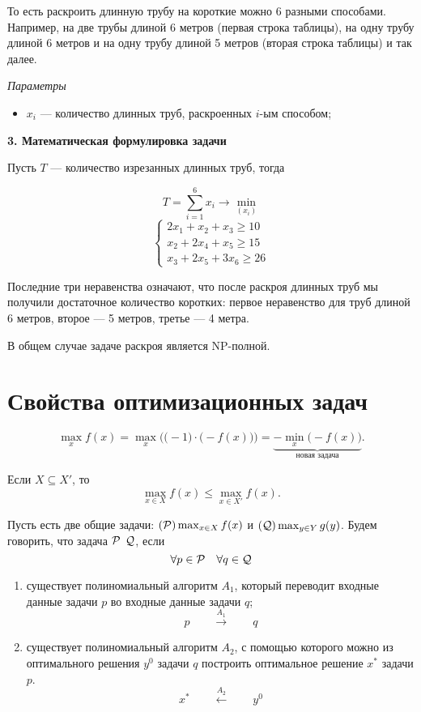 То есть раскроить длинную трубу на короткие можно 6 разными способами. Например, на две трубы длиной 6 метров (первая строка таблицы), на одну трубу длиной 6 метров и на одну трубу длиной 5 метров (вторая строка таблицы) и так далее.

\bigskip

\textit{Параметры}

\begin{itemize}[nosep]
	\item $x_i$ --- количество длинных труб, раскроенных $i$-ым способом;
\end{itemize}

\bigskip

\textbf{3. Математическая формулировка задачи}

Пусть $T$ --- количество изрезанных длинных труб, тогда

\[
T = \sum_{i=1}^6 x_i \to \min_{(x_i)}
\]
\[
\begin{cases}
	2x_1 + x_2 + x_3 \ge 10 \\
	x_2 + 2x_4 + x_5 \ge 15 \\
	x_3 + 2x_5 + 3x_6 \ge 26
\end{cases}
\]

Последние три неравенства означают, что после раскроя длинных труб мы получили достаточное количество коротких: первое неравенство для труб длиной 6 метров, второе --- 5 метров, третье --- 4 метра.

\remark

В общем случае задаче раскроя является NP-полной.

\section{Свойства оптимизационных задач}

\fact

\[\max_x f(x) = \max_x \Big(\big(-1\big) \cdot \big(-f(x)\big)\Big) = \underbrace{-\min_x \big(-f(x)\big)}_{\text{новая задача}}.\]


Если $X \subseteq X'$, то
\[
\max_{x \in X} f(x) \le \max_{x \in X'} f(x).
\]


Пусть есть две общие задачи: $(\P) \max_{x \in X} f(x)$ и $(\Q) \max_{y \in Y} g(y)$. Будем говорить, что задача $\P$  $\Q$, если
\[
\forall p \in \P \quad \forall q \in \Q
\]

\begin{enumerate}[nosep]
	\item существует полиномиальный алгоритм $A_1$, который переводит входные данные задачи $p$ во входные данные задачи $q$;
	\[
	p \qquad \stackrel{A_1}{\longrightarrow} \qquad q
	\]
	
	\item существует полиномиальный алгоритм $A_2$, с помощью которого можно из оптимального решения $y^0$ задачи $q$ построить оптимальное решение $x^*$ задачи $p$.
	\[
	x^* \qquad \stackrel{A_2}{\longleftarrow} \qquad y^0
	\]
\end{enumerate}

